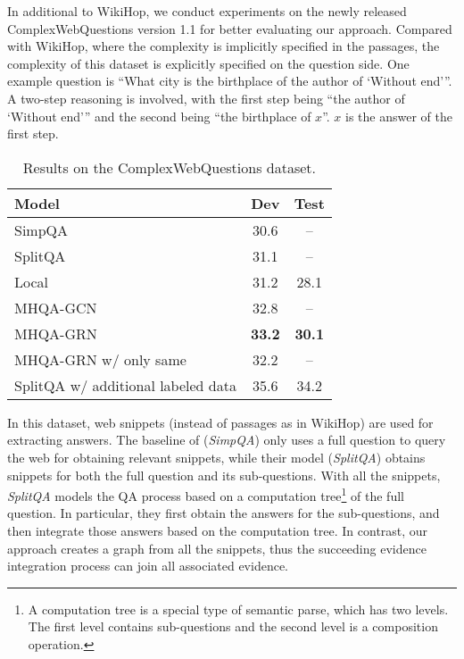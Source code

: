 \documentclass[letterpaper]{article}
\begin{document}
In additional to WikiHop, we conduct experiments on the newly released ComplexWebQuestions version 1.1 \citep{N18-1059} for better evaluating our approach.
Compared with WikiHop, where the complexity is implicitly specified in the passages, the complexity of this dataset is explicitly specified on the question side.
One example question is ``What city is the birthplace of the author of `Without end'''.
A two-step reasoning is involved, with the first step being ``the author of `Without end''' and the second being ``the birthplace of $x$''. 
$x$ is the answer of the first step.


\begin{table}
\centering
\begin{tabular}{l|c|c}
Model & Dev & Test \\
\hline
SimpQA & 30.6 & -- \\
SplitQA & 31.1 & -- \\
\hline
Local & 31.2 & 28.1 \\
MHQA-GCN & 32.8 & -- \\
MHQA-GRN & \bf 33.2 & \bf 30.1 \\
MHQA-GRN w/ only same & 32.2 & -- \\
\hline
\hline
SplitQA w/ additional labeled data & 35.6 & 34.2 \\
\end{tabular}
\caption{Results on the ComplexWebQuestions dataset.}
\label{tab:compqa}
\end{table}


In this dataset, web snippets (instead of passages as in WikiHop) are used for extracting answers.
The baseline of \citet{N18-1059} (\emph{SimpQA}) only uses a full question to query the web for obtaining relevant snippets, while their model (\emph{SplitQA}) obtains snippets for both the full question and its sub-questions.
With all the snippets, \emph{SplitQA} models the QA process based on a computation tree\footnote{A computation tree is a special type of semantic parse, which has two levels. The first level contains sub-questions and the second level is a composition operation.} of the full question. 
In particular, they first obtain the answers for the sub-questions, and then integrate those answers based on the computation tree.
In contrast, our approach creates a graph from all the snippets, thus the succeeding evidence integration process can join all associated evidence.
\end{document}
